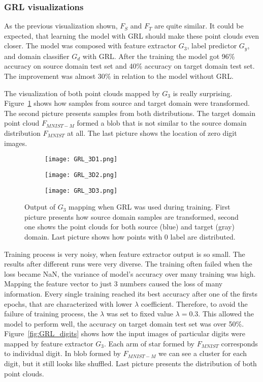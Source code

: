 \documentclass{article}
\begin{document}
\subsubsection{GRL visualizations}
As the previous visualization shown, $F_{S}$ and $F_{T}$ are quite similar. It could be expected, that learning the model with GRL should make these point clouds even closer. The model was composed with feature extractor $G_{3}$, label predictor $G_{y}$, and domain classifier $G_{d}$ with GRL. After the training the model got 96\% accuracy on source domain test set and 40\% accuracy on target domain test set. The improvement was almost 30\% in relation to the model without GRL.
\par
The visualization of both point clouds mapped by $G_{3}$ is really surprising.  Figure~\ref{fig:GRL3D} shows how samples from source and target domain were transformed. The second picture presents samples from both distributions. The target domain point cloud $F_{MNIST-M}$ formed a blob that is not similar to the source domain distribution $F_{MNIST}$ at all. The last picture shows the location of zero digit images.

\begin{figure}[htb]%
    \centering
    \begin{subfigure}[b]{0.33\textwidth}
        \texttt{[image: GRL\_3D1.png]}
    \end{subfigure}%
    \begin{subfigure}[b]{0.33\textwidth}
        \texttt{[image: GRL\_3D2.png]}
    \end{subfigure}%
    \begin{subfigure}[b]{0.33\textwidth}
        \texttt{[image: GRL\_3D3.png]}
    \end{subfigure}%
    
    \caption{Output of $G_{3}$ mapping when GRL was used during training. First picture presents how source domain samples are transformed, second one shows the point clouds for both source (blue) and target (gray) domain. Last picture shows how points with 0 label are distributed.}%
    \label{fig:GRL3D}%
\end{figure}
\par
Training process is very noisy, when feature extractor output is so small. The results after different runs were very diverse. The training often failed when the loss became NaN, the variance of model's accuracy over many training was high. Mapping the feature vector to just 3 numbers caused the loss of many information. Every single training reached its best accuracy after one of the firsts epochs, that are characterized with lower $\lambda$ coefficient. Therefore, to avoid the failure of training process, the $\lambda$ was set to fixed value $\lambda = 0.3$. This allowed the model to perform well, the accuracy on target domain test set was over 50\%.  Figure~\ref{fig:GRL_digits} shows how the input images of particular digits were mapped by feature extractor $G_{3}$. Each arm of star formed by $F_{MNIST}$ corresponds to individual digit. In blob formed by $F_{MNIST-M}$ we can see a cluster for each digit, but it still looks like shuffled. Last picture presents the distribution of both point clouds.
\end{document}
